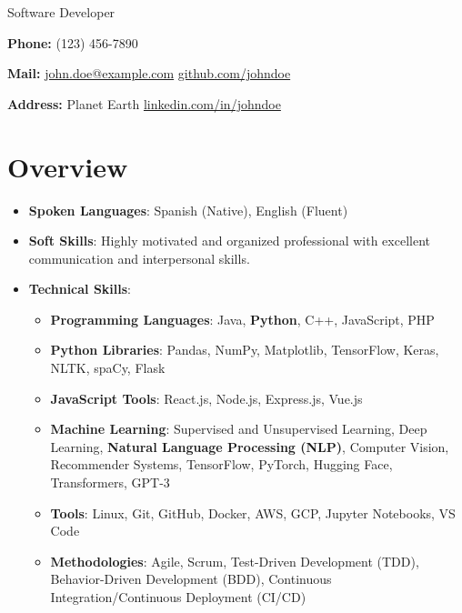 \documentclass[a4paper,10pt]{article} %
\begin{document}

\noindent Software Developer

\bigbreak

\noindent \textbf{Phone:} (123) 456-7890

\noindent \textbf{Mail:} \href{mailto:john.doe@example.com}{john.doe@example.com} \hfill \href{https://github.com/johndoe}{github.com/johndoe}

\noindent \textbf{Address:} Planet Earth \hfill \href{https://linkedin.com/in/johndoe}{linkedin.com/in/johndoe}

\section*{Overview}

\begin{itemize}[leftmargin=*]
    \item \textbf{Spoken Languages}: Spanish (Native), English (Fluent)
    \item \textbf{Soft Skills}: Highly motivated and organized professional with excellent communication and interpersonal skills.
    \item \textbf{Technical Skills}:
          \begin{itemize}
              \item[\textbullet] \textbf{Programming Languages}: Java, {\large \textbf{Python}}, C++, JavaScript, PHP
              \item[\textbullet] \textbf{Python Libraries}: Pandas, NumPy, Matplotlib, TensorFlow, Keras, NLTK, spaCy, Flask
              \item[\textbullet] \textbf{JavaScript Tools}: React.js, Node.js, Express.js, Vue.js
              \item[\textbullet] \textbf{Machine Learning}: Supervised and Unsupervised Learning, Deep Learning, \textbf{Natural Language Processing (NLP)}, Computer Vision, Recommender Systems, TensorFlow, PyTorch, Hugging Face, Transformers, GPT-3
              \item[\textbullet] \textbf{Tools}: Linux, Git, GitHub, Docker, AWS, GCP, Jupyter Notebooks, VS Code
              \item[\textbullet] \textbf{Methodologies}: Agile, Scrum, Test-Driven Development (TDD), Behavior-Driven Development (BDD), Continuous Integration/Continuous Deployment (CI/CD)
          \end{itemize}
\end{itemize}
\end{document}
